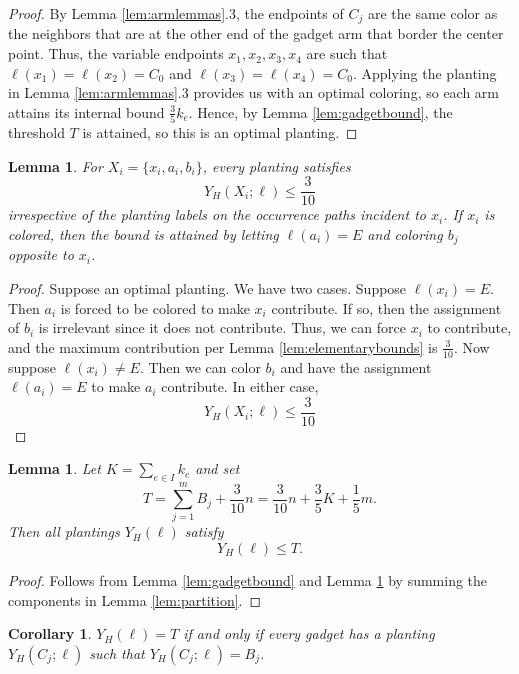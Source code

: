 \documentclass[11pt]{article}
\theoremstyle{plain}
\newtheorem{lemma}[theorem]{Lemma}
\newtheorem{corollary}[theorem]{Corollary}
\begin{document}
\begin{proof}
    By Lemma \ref{lem:armlemmas}.3, the endpoints of $C_j$ are the same color as the neighbors that are at the other end of the gadget arm that border the center point. Thus, the variable endpoints $x_1, x_2, x_3, x_4$ are such that $\ell(x_1) = \ell (x_2) = C_0$ and $\ell(x_3) = \ell (x_4) = C_0$. Applying the planting in Lemma \ref{lem:armlemmas}.3 provides us with an optimal coloring, so each arm attains its internal bound $\frac{3}{5}k_e$. Hence, by Lemma \ref{lem:gadgetbound}, the threshold $T$ is attained, so this is an optimal planting.
\end{proof}

\begin{lemma} \label{lem:tailbound}
    For $X_i = \{x_i, a_i, b_i\}$, every planting satisfies 
    \[Y_H (X_i; \ell) \leq \frac{3}{10}\]
    irrespective of the planting labels on the occurrence paths incident to $x_i$. If $x_i$ is colored, then the bound is attained by letting $\ell(a_i) = E$ and coloring $b_j$ opposite to $x_i$.
\end{lemma}

\begin{proof}
    Suppose an optimal planting. We have two cases. Suppose $\ell(x_i) = E$. Then $a_i$ is forced to be colored to make $x_i$ contribute. If so, then the assignment of $b_i$ is irrelevant since it does not contribute. Thus, we can force $x_i$ to contribute, and the maximum contribution per Lemma \ref{lem:elementarybounds} is $\frac{3}{10}$. Now suppose $\ell(x_i) \neq E$. Then we can color $b_i$ and have the assignment $\ell(a_i) = E$ to make $a_i$ contribute. In either case, 
    \[Y_H (X_i; \ell) \leq \frac{3}{10}\]
\end{proof}

\begin{lemma} \label{lem:plantbound}
    Let $K = \sum_{e\in I}k_e$ and set 
    \[T= \sum_{j=1}^m B_j + \frac{3}{10}n = \frac{3}{10}n + \frac{3}{5}K + \frac{1}{5}m.\] 
    Then all plantings $Y_H(\ell)$ satisfy
    \[Y_H(\ell) \leq T.\] 
\end{lemma}

\begin{proof}
    Follows from Lemma \ref{lem:gadgetbound} and Lemma \ref{lem:tailbound} by summing the components in Lemma \ref{lem:partition}.
\end{proof}

\begin{corollary} \label{cor:thresholdgadgetbound}
    $Y_H(\ell) = T$ if and only if every gadget has a planting $Y_H(C_j; \ell)$ such that $Y_H(C_j; \ell) = B_j$.
\end{corollary}
\end{document}
